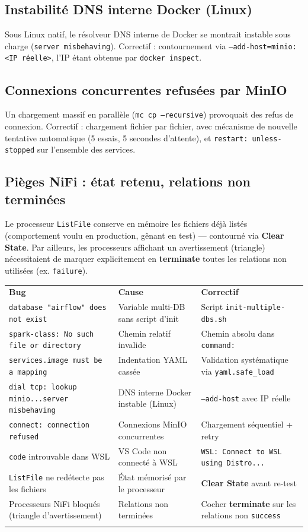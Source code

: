 \documentclass[11pt,a4paper]{report}
\let\oldtoprule\toprule
\renewcommand{\toprule}{\arrayrulecolor{corpslate}\oldtoprule\arrayrulecolor{black}}
\let\oldmidrule\midrule
\renewcommand{\midrule}{\arrayrulecolor{emsigreen}\oldmidrule\arrayrulecolor{black}}
\let\oldbottomrule\bottomrule
\renewcommand{\bottomrule}{\arrayrulecolor{corpslate}\oldbottomrule\arrayrulecolor{black}}
\begin{document}
\subsection{Instabilité DNS interne Docker (Linux)}
Sous Linux natif, le résolveur DNS interne de Docker se montrait instable
sous charge (\texttt{server misbehaving}). Correctif : contournement via
\texttt{--add-host=minio:<IP réelle>}, l'IP étant obtenue par
\texttt{docker inspect}.

\subsection{Connexions concurrentes refusées par MinIO}
Un chargement massif en parallèle (\texttt{mc cp --recursive}) provoquait
des refus de connexion. Correctif : chargement fichier par fichier, avec
mécanisme de nouvelle tentative automatique (5 essais, 5 secondes
d'attente), et \texttt{restart: unless-stopped} sur l'ensemble des
services.

\subsection{Pièges NiFi : état retenu, relations non terminées}
Le processeur \texttt{ListFile} conserve en mémoire les fichiers déjà
listés (comportement voulu en production, gênant en test) — contourné via
\textbf{Clear State}. Par ailleurs, les processeurs affichant un
avertissement (triangle) nécessitaient de marquer explicitement en
\textbf{terminate} toutes les relations non utilisées (ex.
\texttt{failure}).

\begin{center}
\begin{tabular}{@{}p{4.6cm}p{4.6cm}p{5.2cm}@{}}
\toprule
\rowcolor{corpslate!10}
\textbf{Bug} & \textbf{Cause} & \textbf{Correctif} \\
\midrule
\texttt{database "airflow" does not exist} & Variable multi-DB sans script d'init & Script \texttt{init-multiple-dbs.sh} \\
\texttt{spark-class: No such file or directory} & Chemin relatif invalide & Chemin absolu dans \texttt{command:} \\
\texttt{services.image must be a mapping} & Indentation YAML cassée & Validation systématique via \texttt{yaml.safe\_load} \\
\texttt{dial tcp: lookup minio...server misbehaving} & DNS interne Docker instable (Linux) & \texttt{--add-host} avec IP réelle \\
\texttt{connect: connection refused} & Connexions MinIO concurrentes & Chargement séquentiel + retry \\
\texttt{code} introuvable dans WSL & VS Code non connecté à WSL & \texttt{WSL: Connect to WSL using Distro...} \\
\texttt{ListFile} ne redétecte pas les fichiers & État mémorisé par le processeur & \textbf{Clear State} avant re-test \\
Processeurs NiFi bloqués (triangle d'avertissement) & Relations non terminées & Cocher \textbf{terminate} sur les relations non \texttt{success} \\
\bottomrule
\end{tabular}
\end{center}
\end{document}

